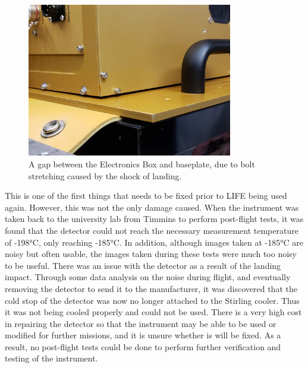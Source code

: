 \begin{figure}
    \centering
    \includegraphics[width=0.8\textwidth]{chap4_images/LIFE_impact_result.jpg}
    \caption{A gap between the Electronics Box and baseplate, due to bolt stretching caused by the shock of landing.}
    \label{fig:landing_damage_image}
\end{figure}

This is one of the first things that needs to be fixed prior to LIFE being used again. However, this was not the only damage caused. When the instrument was taken back to the university lab from Timmins to perform post-flight tests, it was found that the detector could not reach the necessary measurement temperature of -198°C, only reaching -185°C. In addition, although images taken at -185°C are noisy but often usable, the images taken during these tests were much too noisy to be useful. There was an issue with the detector as a result of the landing impact. Through some data analysis on the noise during flight, and eventually removing the detector to send it to the manufacturer, it was discovered that the cold stop of the detector was now no longer attached to the Stirling cooler. Thus it was not being cooled properly and could not be used. There is a very high cost in repairing the detector so that the instrument may be able to be used or modified for further missions, and it is unsure whether is will be fixed. As a result, no post-flight tests could be done to perform further verification and testing of the instrument.

